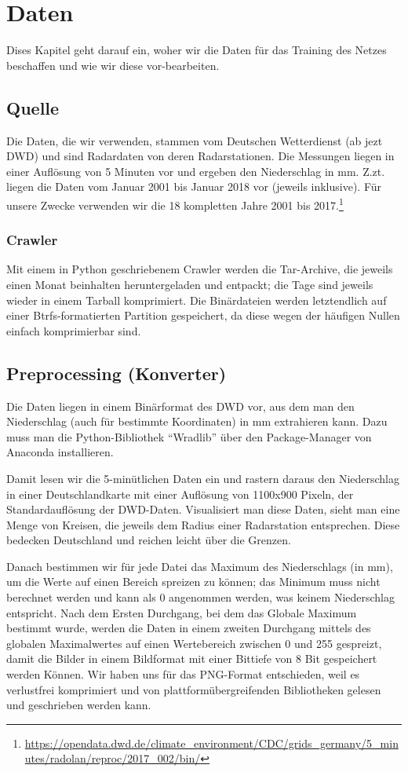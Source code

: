 \section{Daten}
Dises Kapitel geht darauf ein, woher wir die Daten für das Training des Netzes beschaffen und wie wir diese vor-bearbeiten.

\subsection{Quelle}
Die Daten, die wir verwenden, stammen vom Deutschen Wetterdienst (ab jezt DWD) und sind Radardaten von deren Radarstationen. Die Messungen liegen in einer Auflösung von 5 Minuten vor und ergeben den Niederschlag in mm. Z.zt. liegen die Daten vom Januar 2001 bis Januar 2018 vor (jeweils inklusive). Für unsere Zwecke verwenden wir die 18 kompletten Jahre 2001 bis 2017.\footnote{\url{https://opendata.dwd.de/climate\_environment/CDC/grids\_germany/5\_minutes/radolan/reproc/2017\_002/bin/}}

\subsubsection{Crawler}
Mit einem in Python geschriebenem Crawler werden die Tar-Archive, die jeweils einen Monat beinhalten heruntergeladen und entpackt; die Tage sind jeweils wieder in einem Tarball komprimiert. Die Binärdateien werden letztendlich auf einer Btrfs-formatierten Partition gespeichert, da diese wegen der häufigen Nullen einfach komprimierbar sind.

\subsection{Preprocessing (Konverter)}
Die Daten liegen in einem Binärformat des DWD vor, aus dem man den Niederschlag (auch für bestimmte Koordinaten) in mm extrahieren kann. Dazu muss man die Python-Bibliothek \enquote{Wradlib} über den Package-Manager von Anaconda installieren.

Damit lesen wir die 5-minütlichen Daten ein und rastern daraus den Niederschlag in einer Deutschlandkarte mit einer Auflösung von 1100x900 Pixeln, der Standardauflösung der DWD-Daten. Visualisiert man diese Daten, sieht man eine Menge von Kreisen, die jeweils dem Radius einer Radarstation entsprechen. Diese bedecken Deutschland und reichen leicht über die Grenzen.

Danach bestimmen wir für jede Datei das Maximum des Niederschlags (in mm), um die Werte auf einen Bereich spreizen zu können; das Minimum muss nicht berechnet werden und kann als 0 angenommen werden, was keinem Niederschlag entspricht.
Nach dem Ersten Durchgang, bei dem das Globale Maximum bestimmt wurde, werden die Daten in einem zweiten Durchgang mittels  des globalen Maximalwertes auf einen Wertebereich zwischen 0 und 255 gespreizt, damit die Bilder in einem Bildformat mit einer Bittiefe von 8 Bit gespeichert werden Können. Wir haben uns für das PNG-Format entschieden, weil es verlustfrei komprimiert und von plattformübergreifenden Bibliotheken gelesen und geschrieben werden kann.

